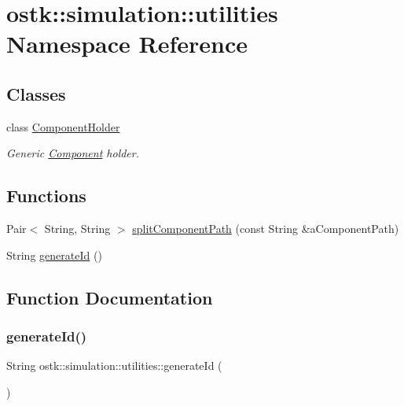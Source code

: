 \hypertarget{namespaceostk_1_1simulation_1_1utilities}{}\section{ostk\+:\+:simulation\+:\+:utilities Namespace Reference}
\label{namespaceostk_1_1simulation_1_1utilities}
\subsection*{Classes}
\begin{DoxyCompactItemize}
\item 
class \hyperlink{classostk_1_1simulation_1_1utilities_1_1_component_holder}{Component\+Holder}
\begin{DoxyCompactList}\small\item\em Generic \hyperlink{classostk_1_1simulation_1_1_component}{Component} holder. \end{DoxyCompactList}\end{DoxyCompactItemize}
\subsection*{Functions}
\begin{DoxyCompactItemize}
\item 
Pair$<$ String, String $>$ \hyperlink{namespaceostk_1_1simulation_1_1utilities_a7fd2c2aead74267f4a1dfc806741986d}{split\+Component\+Path} (const String \&a\+Component\+Path)
\item 
String \hyperlink{namespaceostk_1_1simulation_1_1utilities_af82e4a0a4778c822b22d8aa74f104f68}{generate\+Id} ()
\end{DoxyCompactItemize}


\subsection{Function Documentation}
\mbox{\label{namespaceostk_1_1simulation_1_1utilities_af82e4a0a4778c822b22d8aa74f104f68}} 
\subsubsection{\texorpdfstring{generate\+Id()}{generateId()}}
{\footnotesize\ttfamily String ostk\+::simulation\+::utilities\+::generate\+Id (\begin{DoxyParamCaption}{ }\end{DoxyParamCaption})}


